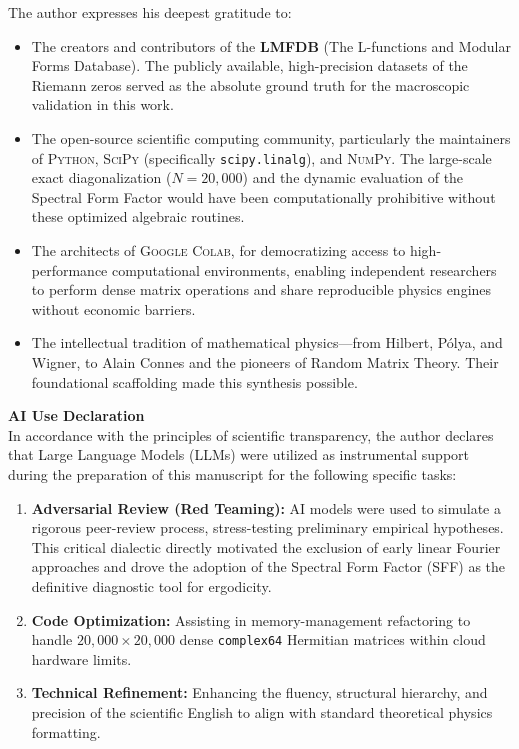 \documentclass[aps,prl,preprint,superscriptaddress,floatfix]{revtex4-2}
\begin{document}
\begin{acknowledgments}
The author expresses his deepest gratitude to:

\begin{itemize}
    \item The creators and contributors of the \textbf{LMFDB} (The L-functions and Modular Forms Database). The publicly available, high-precision datasets of the Riemann zeros served as the absolute ground truth for the macroscopic validation in this work.
    \item The open-source scientific computing community, particularly the maintainers of \textsc{Python}, \textsc{SciPy} (specifically \texttt{scipy.linalg}), and \textsc{NumPy}. The large-scale exact diagonalization ($N=20,000$) and the dynamic evaluation of the Spectral Form Factor would have been computationally prohibitive without these optimized algebraic routines.
    \item The architects of \textsc{Google Colab}, for democratizing access to high-performance computational environments, enabling independent researchers to perform dense matrix operations and share reproducible physics engines without economic barriers.
    \item The intellectual tradition of mathematical physics—from Hilbert, Pólya, and Wigner, to Alain Connes and the pioneers of Random Matrix Theory. Their foundational scaffolding made this synthesis possible.
\end{itemize}

\vspace{0.3cm}
\noindent \textbf{AI Use Declaration} \\
In accordance with the principles of scientific transparency, the author declares that Large Language Models (LLMs) were utilized as instrumental support during the preparation of this manuscript for the following specific tasks:

\begin{enumerate}
    \item \textbf{Adversarial Review (Red Teaming):} AI models were used to simulate a rigorous peer-review process, stress-testing preliminary empirical hypotheses. This critical dialectic directly motivated the exclusion of early linear Fourier approaches and drove the adoption of the Spectral Form Factor (SFF) as the definitive diagnostic tool for ergodicity.
    \item \textbf{Code Optimization:} Assisting in memory-management refactoring to handle $20,000 \times 20,000$ dense \texttt{complex64} Hermitian matrices within cloud hardware limits.
    \item \textbf{Technical Refinement:} Enhancing the fluency, structural hierarchy, and precision of the scientific English to align with standard theoretical physics formatting.
\end{enumerate}


\end{acknowledgments}
\end{document}
